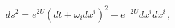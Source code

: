 \begin{equation} \label{stationarymetric}
 ds^2 = e^{2U} \left(dt + \omega_i dx^i\right)^2 - e^{-2 U} dx^i
 dx^i\,,
\end{equation}

